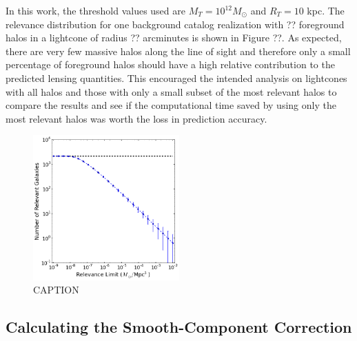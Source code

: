 \documentclass[%
 reprint,
 amsmath,amssymb,
 aps,nofootinbib
]{revtex4-1}
\begin{document}
In this work, the threshold values used are $M_T=10^{12}M_\odot$ and $R_T=10$ kpc. The relevance distribution for one background catalog realization with ?? foreground halos in a lightcone of radius ?? arcminutes is shown in Figure ??. As expected, there are very few massive halos along the line of sight and therefore only a small percentage of foreground halos should have a high relative contribution to the predicted lensing quantities. This encouraged the intended analysis on lightcones with all halos and those with only a small subset of the most relevant halos to compare the results and see if the computational time saved by using only the most relevant halos was worth the loss in prediction accuracy.

\begin{figure}
    \centering
    \includegraphics[width=0.5\textwidth]{figs-swe/thesis/relevance_distribution.png}
    \captionsetup{justification=raggedright,singlelinecheck=false}
    \caption{CAPTION}
    \label{fig:rel_dist}
\end{figure}


\subsection{Calculating the Smooth-Component Correction} \label{calc_scc}
\end{document}
